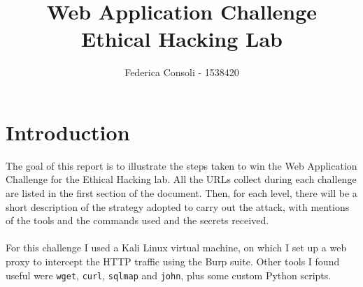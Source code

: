 \documentclass[12pt,a4paper]{article}
\author{Federica Consoli - 1538420}
\title{Web Application Challenge \\ \large Ethical Hacking Lab}
\begin{document}
	\maketitle
	\section*{Introduction}
		The goal of this report is to illustrate the steps taken to win the Web Application Challenge for the Ethical Hacking lab. All the URLs collect during each challenge are listed in the first section of the document. Then, for each level, there will be a short description of the strategy adopted to carry out the attack, with mentions of the tools and the commands used and the secrets received.\\\\
		For this challenge I used a Kali Linux virtual machine, on which I set up a web proxy to intercept the HTTP traffic using the Burp suite. Other tools I found useful were \texttt{wget}, \texttt{curl}, \texttt{sqlmap} and \texttt{john}, plus some custom Python scripts.
		 
\end{document}

